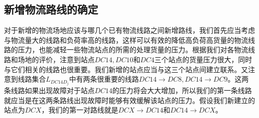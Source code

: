 \documentclass{MathorCupmodeling}
\begin{document}
\begin{table}[h]
\begin{floatrow}
\end{floatrow}
\end{table}














\subsection{新增物流路线的确定}
对于新增的物流场地应该与哪几个已有物流线路之间新增路线，我们首先应当考虑与物流量大的线路和负荷率高的线路，这样可以有效的降低高负荷高货量的物流线路的压力，也能减轻一些物流站点的所需的处理货量的压力。根据我们对各物流线路和场地的评价，注意到站点$DC14,DC10$和$DC4$三个站点的货量压力很大，同时与它们相关的线路也很重要。我们新增的站点应当与这三个站点间建立联系。又注意到线路集合$L_{DC14D_j}$中有两条很重要的线路$DC14\to DC8,DC14\to DC9$。这两条线路如果出现故障对于站点$DC14$的压力将会大大增加，所以我们的第一条线路就应当是在这两条路线出现故障时能够有效缓解该站点的压力。假设我们新建立的站点为$DCX$，我们的第一对路线就是$DCX\to DC14$和$DC14\to DCX$。
\end{document}
